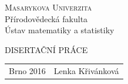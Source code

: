 \documentclass[a4paper,12pt]{report}
\date{\today}
\theoremstyle{definition} \newtheorem{definice}[veta]{Definice}
\theoremstyle{remark}
\begin{document}
\titlepage
\vspace*{-2.4cm}
\begin{center}
\textsc{\Large{Masarykova Univerzita}} \\
\large{Přírodovědecká fakulta} \\
\large{Ústav matematiky a statistiky}
\end{center}
\vspace{7.11cm}
%
\begin{center}
\textsc{\Large{DISERTAČNÍ PRÁCE}}
\end{center}
%
\vspace{11.39cm}
%
\begin{center}
\begin{tabular}{l  r}
 \Large{Brno 2016} \qquad\qquad\qquad\qquad \qquad\qquad & \Large{Lenka Křivánková}
\end{tabular}
\end{center}
\end{document}

